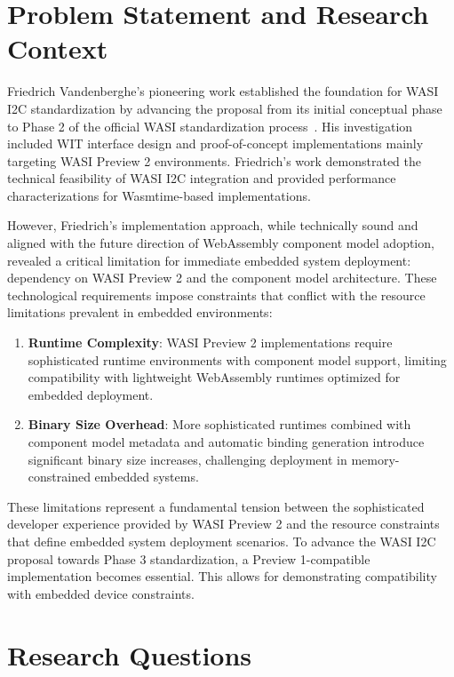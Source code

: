 \section{Problem Statement and Research Context}
\label{sec:problem-statement}

Friedrich Vandenberghe's pioneering work established the foundation for WASI I2C standardization by advancing the proposal from its initial conceptual phase to Phase 2 of the official WASI standardization process~\cite{friedrich_paper}. His investigation included WIT interface design and proof-of-concept implementations mainly targeting WASI Preview 2 environments. Friedrich's work demonstrated the technical feasibility of WASI I2C integration and provided performance characterizations for Wasmtime-based implementations.

However, Friedrich's implementation approach, while technically sound and aligned with the future direction of WebAssembly component model adoption, revealed a critical limitation for immediate embedded system deployment: dependency on WASI Preview 2 and the component model architecture. These technological requirements impose constraints that conflict with the resource limitations prevalent in embedded environments:

\begin{enumerate}
    \item \textbf{Runtime Complexity}: WASI Preview 2 implementations require sophisticated runtime environments with component model support, limiting compatibility with lightweight WebAssembly runtimes optimized for embedded deployment.
    
    \item \textbf{Binary Size Overhead}: More sophisticated runtimes combined with component model metadata and automatic binding generation introduce significant binary size increases, challenging deployment in memory-constrained embedded systems.
\end{enumerate}

These limitations represent a fundamental tension between the sophisticated developer experience provided by WASI Preview 2 and the resource constraints that define embedded system deployment scenarios. To advance the WASI I2C proposal towards Phase 3 standardization, a Preview 1-compatible implementation becomes essential. This allows for demonstrating compatibility with embedded device constraints.




\section{Research Questions}
\label{sec:research-questions}

